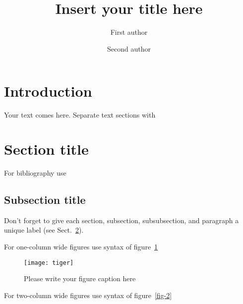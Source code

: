 \documentclass{ifpen-ogst}
\begin{document}
%
\title{Insert your title here}
%
%
%
%
\author{First author\inst{\ref{first},\ref{finish}} \and
        Second author\inst{\ref{second}}\correspondingauthor
}
%
%
%
%
%
\maketitle
%
\section{Introduction}
\label{intro}
Your text comes here. Separate text sections with
\section{Section title}
\label{sec-1}
For bibliography use \cite{RefJ}
\subsection{Subsection title}
\label{sec-2}
Don't forget to give each section, subsection, subsubsection, and
paragraph a unique label (see Sect.~\ref{sec-1}).

For one-column wide figures use syntax of figure~\ref{fig-1}
\begin{figure}
\centering
\texttt{[image: tiger]}
\caption{Please write your figure caption here}
\label{fig-1}       %
\end{figure}

For two-column wide figures use syntax of figure~\ref{fig-2}
\begin{figure*}
\vspace*{5cm}       %
\caption{Please write your figure caption here}
\label{fig-2}       %
\end{figure*}
\end{document}
